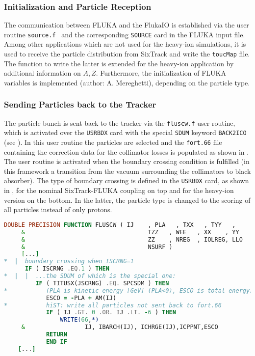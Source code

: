 \subsubsection{Initialization and Particle Reception}

The communication between FLUKA and the FlukaIO is established via the user routine \texttt{source.f}~\cite{} and the corresponding \texttt{SOURCE} card in the FLUKA input file. Among other applications which are not used for the heavy-ion simulations, it is used to receive the particle distribution from SixTrack and write the \texttt{toucMap} file. The function to write the latter is extended for the heavy-ion application by additional information on $A,Z$. Furthermore, the initialization of FLUKA variables is implemented (author: A. Mereghetti), depending on the particle type. 

\subsubsection{Sending Particles back to the Tracker}

The particle bunch is sent back to the tracker via the \texttt{fluscw.f} user routine, which is activated over the \texttt{USRBDX} card with the special \texttt{SDUM} keyword \texttt{BACK2ICO} (see \cite{FLUKA:manual}). In this user routine the particles are selected and the \texttt{fort.66} file containing the correction data for the collimator losses is populated as shown in . The user routine is activated when the boundary crossing condition is fulfilled (in this framework a transition from the vacuum surrounding the collimators to black absorber). The type of boundary crossing is defined in the \texttt{USRBDX} card, as shown in , for the nominal SixTrack-FLUKA coupling on top and for the heavy-ion version on the bottom. In the latter, the particle type is changed to the scoring of all particles instead of only protons.

\vspace{0.5cm}
\begin{minipage}{\linewidth}
\begin{lstlisting}[language=Fortran,caption=Send particles to FLUKA as implemented in hiSixTrack.,label=lst:fluscw]
      DOUBLE PRECISION FUNCTION FLUSCW ( IJ    , PLA   , TXX   , TYY   ,
     &                                   TZZ   , WEE   , XX    , YY    ,
     &                                   ZZ    , NREG  , IOLREG, LLO   ,
     &                                   NSURF )
     [...]
*  |  boundary crossing when ISCRNG=1
      IF ( ISCRNG .EQ.1 ) THEN
*  |  |  ...the SDUM of which is the special one:
         IF ( TITUSX(JSCRNG) .EQ. SPCSDM ) THEN
*           (PLA is kinetic energy [GeV] (PLA<0), ESCO is total energy)
            ESCO = -PLA + AM(IJ)
*           hiST: write all particles not sent back to fort.66
            IF ( IJ .GT. 0 .OR. IJ .LT. -6 ) THEN
                WRITE(66,*) 
     &                 IJ, IBARCH(IJ), ICHRGE(IJ),ICPPNT,ESCO
            RETURN
            END IF
    [...]
\end{lstlisting}
\end{minipage}


